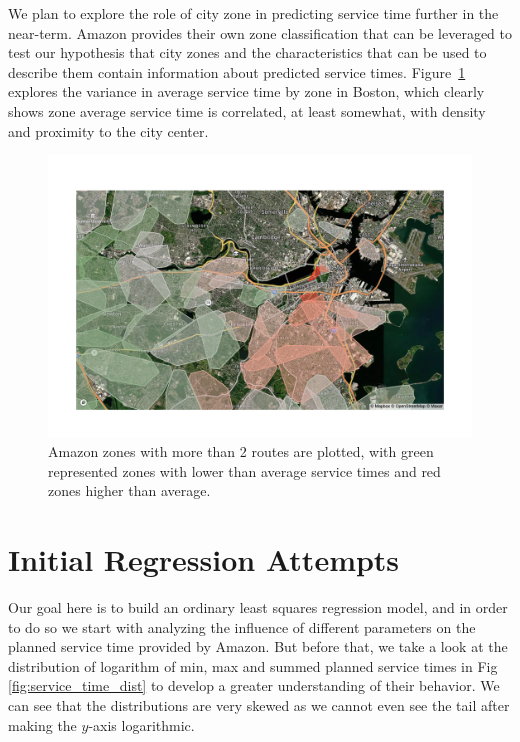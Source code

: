 \documentclass[12pt]{article}
\theoremstyle{plain}
\numberwithin{equation}{section}
\begin{document}
We plan to explore the role of city zone in predicting service time further in the near-term. Amazon provides their own zone classification that can be leveraged to test our hypothesis that city zones and the characteristics that can be used to describe them contain information about predicted service times. Figure~\ref{fig:city_zones} explores the variance in average service time by zone in Boston, which clearly shows zone average service time is correlated, at least somewhat, with density and proximity to the city center.

\begin{figure}[h!]
\centering
\includegraphics[width=1\textwidth]{Images/zones_n_average_time.png}
\caption{Amazon zones with more than 2 routes are plotted, with green represented zones with lower than average service times and red zones higher than average.}
\label{fig:city_zones}
\end{figure}


\section{Initial Regression Attempts}

Our goal here is to build an ordinary least squares regression model, and in order to do so we start with analyzing the influence of different parameters on the planned service time provided by Amazon. But before that, we take a look at the distribution of logarithm of min, max and summed planned service times in Fig \ref{fig:service_time_dist} to develop a greater understanding of their behavior. We can see that the distributions are very skewed as we cannot even see the tail after making the $y$-axis logarithmic.
\end{document}

